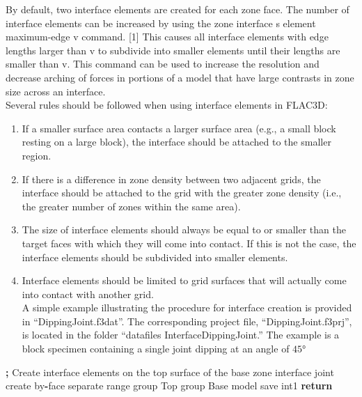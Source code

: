 \documentclass[a4paper, nobind]{templates/ociamthesis}
\providecommand{\tightlist}{%
  \setlength{\itemsep}{0pt}\setlength{\parskip}{0pt}}
\newenvironment{Shaded}{\begin{snugshade}}{\end{snugshade}}
\newcommand{\BuiltInTok}[1]{#1}
\newcommand{\ControlFlowTok}[1]{\textcolor[rgb]{0.13,0.29,0.53}{\textbf{#1}}}
\newcommand{\NormalTok}[1]{#1}
\newcommand{\OperatorTok}[1]{\textcolor[rgb]{0.81,0.36,0.00}{\textbf{#1}}}
\newcommand{\StringTok}[1]{\textcolor[rgb]{0.31,0.60,0.02}{#1}}
\renewenvironment{Shaded}
{
  \vspace{10pt}%
  \begin{snugshade}%
}{%
  \end{snugshade}%
  \vspace{8pt}%
}
\begin{document}
By default, two interface elements are created for each zone face. The number of interface elements can be increased by using the zone interface s element maximum-edge v command. {[}1{]} This causes all interface elements with edge lengths larger than v to subdivide into smaller elements until their lengths are smaller than v. This command can be used to increase the resolution and decrease arching of forces in portions of a model that have large contrasts in zone size across an interface.\\

Several rules should be followed when using interface elements in FLAC3D:\\

\begin{enumerate}
\def\labelenumi{\arabic{enumi}.}
\tightlist
\item
  If a smaller surface area contacts a larger surface area (e.g., a small block resting on a large block), the interface should be attached to the smaller region.\\
\item
  If there is a difference in zone density between two adjacent grids, the interface should be attached to the grid with the greater zone density (i.e., the greater number of zones within the same area).
\item
  The size of interface elements should always be equal to or smaller than the target faces with which they will come into contact. If this is not the case, the interface elements should be subdivided into smaller elements.\\
\item
  Interface elements should be limited to grid surfaces that will actually come into contact with another grid.\\
  A simple example illustrating the procedure for interface creation is provided in ``DippingJoint.f3dat''. The corresponding project file, ``DippingJoint.f3prj'', is located in the folder ``datafiles InterfaceDippingJoint.'' The example is a block specimen containing a single joint dipping at an angle of \(45°\)
\end{enumerate}

\begin{Shaded}
\begin{Highlighting}[]
\OperatorTok{;}\NormalTok{ Create interface elements on the top surface of the base        }
\NormalTok{zone interface }\StringTok{\textquotesingle{}joint\textquotesingle{}}\NormalTok{ create by}\OperatorTok{{-}}\NormalTok{face separate }\BuiltInTok{range}\NormalTok{ group }\StringTok{\textquotesingle{}Top\textquotesingle{}}\NormalTok{ group }\StringTok{\textquotesingle{}Base\textquotesingle{}}
\NormalTok{model save }\StringTok{\textquotesingle{}int1\textquotesingle{}}
\ControlFlowTok{return}
\end{Highlighting}
\end{Shaded}
\end{document}
